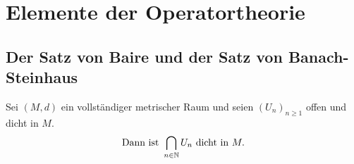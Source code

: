 
\chapter*{Elemente der Operatortheorie}  \setcounter{section}{8}



\section{Der Satz von Baire und der Satz von Banach-Steinhaus}



\begin{satz} \label{satz:9.1-baire} 
	Sei $(M, d)$ ein vollständiger metrischer Raum und seien $(U_{n})_{n \geq 1}$ offen und dicht in $M$.
	\[ \text{Dann ist } \bigcap_{n \in \mathbb{N}} U_{n} \text{ dicht in } M. \]
\end{satz}

